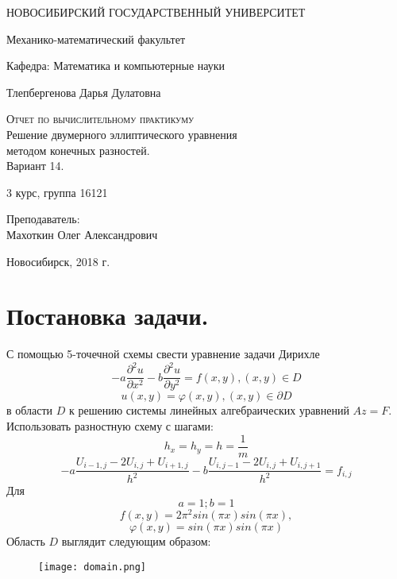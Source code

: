 \documentclass[12pt,a4paper]{scrartcl}
\begin{document}
\begin{titlepage}
  \begin{center}
     
    \vspace{0.5cm}
 
    НОВОСИБИРСКИЙ ГОСУДАРСТВЕННЫЙ УНИВЕРСИТЕТ
    \vspace{0.25cm}
     
    Механико-математический факультет
     
    Кафедра: Математика и компьютерные науки
    \vfill
     
     
    Тлепбергенова Дарья Дулатовна
    \vfill
 
    \textsc{Отчет по вычислительному практикуму}\\[5mm]
     
    {\LARGE Решение двумерного эллиптического уравнения \\
      методом конечных разностей.\\
    Вариант 14.\\[2mm]}
  \bigskip
     
    3 курс, группа 16121
    \end{center}
\vfill
 \newlength{\ML}
    \hfill\begin{minipage}{0.4\textwidth}
     Преподаватель:\\
    Махоткин Олег Александрович
    \end{minipage}%
\bigskip

 \vfill
\begin{center}
  Новосибирск, 2018 г.
\end{center}
\end{titlepage}

\newpage

\section{Постановка задачи.}
С помощью 5-точечной схемы свести уравнение задачи Дирихле
\[
    -a{\dfrac{{\partial}^2 u}{\partial x^{2}}}-b{\dfrac{{\partial}^2 u}{\partial y^{2}}}=f(x,y), (x,y)\in D 
\]
\[
    u(x,y)= \varphi(x,y), (x,y)\in \partial D
\]
в области $D$ к решению системы линейных алгебраических уравнений $Az=F$.
Использовать разностную схему с шагами:
\[
    h_x=h_y=h=\frac{1}{m}
\]
\[
    -a\dfrac{U_{i-1,j}-2U_{i,j}+U_{i+1,j}}{h^2}-b\dfrac{U_{i,j-1}-2U_{i,j}+U_{i,j+1}}{h^2}=f_{i,j}
\]
Для
\[
    a=1; b=1
\]
\[
    f(x,y)=2\pi^2sin(\pi x)sin(\pi x),
\]
\[
     \varphi(x,y)=sin(\pi x)sin(\pi x)
\]
Область $D$ выглядит следующим образом:
\begin{figure}[h]
    \centering
    \texttt{[image: domain.png]}
\end{figure}
\end{document}
